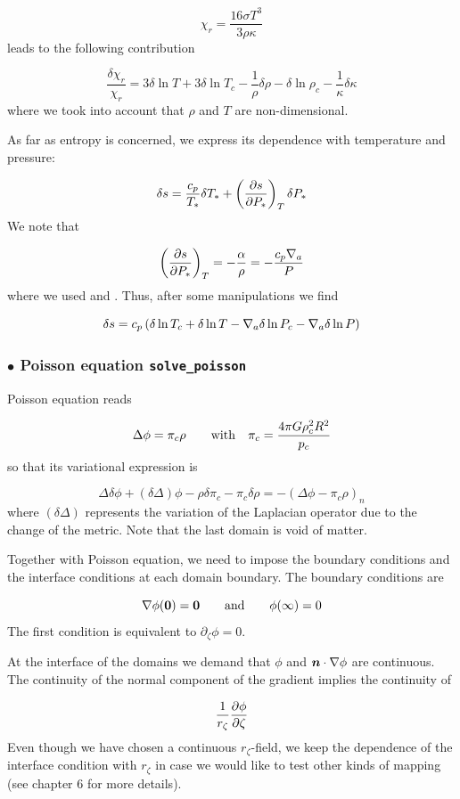 \[ \chi_r = \frac{16\sigma T^3}{3\rho\kappa}\]
leads to the following contribution

\[ \frac{\delta \chi_r}{\chi_r} = 3\delta\ln T+3\delta\ln T_c
-\frac{1}{\rho}\delta\rho - \delta\ln\rho_c - \frac{1}{\kappa}\delta\kappa\]
where we took into account that $\rho$ and $T$ are non-dimensional.

As far as entropy is concerned, we express its dependence with temperature and
pressure:

\[ \delta s = \frac{c_p}{T_*}\delta T_* + \left(\frac{\partial s}{\partial
P_*}\right)_T\delta P_*\]
We note that

\[ \left(\frac{\partial s}{\partial
P_*}\right)_T = -\frac{\alpha}{\rho} = -\frac{c_p\nabla_a}{P}\]
where we used  and .
Thus, after some manipulations we find

\[ \delta s = c_p\left(\delta\ln T_c + \delta\ln T - \nabla_a\delta\ln P_c
-\nabla_a\delta\ln P \right)\]

\subsubsection{$\bullet$ \bf Poisson equation {\tt solve\_poisson}}

Poisson equation reads

\[ \Delta \phi = \pi_c \rho \qquad {\rm with}\quad  \pi_c = \frac{4 \pi G
\rho_c^2 R^2}{p_c}\]
so that its variational expression is 

\[ \Delta \delta\phi +(\delta\Delta)\phi - \rho\delta\pi_c  -
\pi_c\delta\rho = -(\Delta \phi - \pi_c \rho)_n \]
where $(\delta\Delta)$ represents the variation of the Laplacian operator due
to the change of the metric. Note that the last domain is void of matter.

Together with Poisson equation, we need to impose the boundary conditions and
the interface conditions at each domain boundary. The boundary conditions are

\[ \na\phi(\vzero) = \vzero  \andet \phi(\infty) = 0\]
The first condition is equivalent to $\partial_\zeta\phi=0$.

At the interface of the domains we demand that $\phi$ and $\vn\cdot\na\phi$
are continuous. The continuity of the normal component of the gradient implies
the continuity of

\[ \frac{1}{r_\zeta}\frac{\partial \phi}{\partial \zeta}\]
Even though we have chosen a continuous $r_\zeta$-field, we keep the
dependence of the interface condition with $r_\zeta$ in case we would like to
test other kinds of mapping (see chapter 6 for more details).

